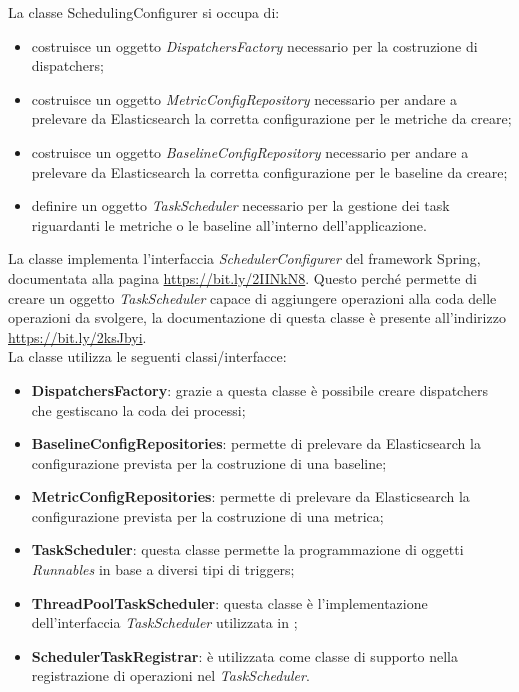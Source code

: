         La classe SchedulingConfigurer si occupa di:
        \begin{itemize}
        	\item costruisce un oggetto \textit{DispatchersFactory} necessario per la costruzione di dispatchers;
        	\item costruisce un oggetto \textit{MetricConfigRepository} necessario per andare a prelevare da 
        		Elasticsearch la corretta configurazione per le metriche da creare;
        	\item costruisce un oggetto \textit{BaselineConfigRepository} necessario per andare a prelevare da 
        		Elasticsearch la corretta configurazione per le baseline da creare;
        	\item definire un oggetto \textit{TaskScheduler} necessario per la gestione dei task riguardanti
        		le metriche o le baseline all'interno dell'applicazione.
        \end{itemize}
        La classe implementa l'interfaccia \textit{SchedulerConfigurer} del framework Spring, documentata alla pagina
        \url{https://bit.ly/2IINkN8}. Questo perché permette di creare un oggetto \textit{TaskScheduler}
        capace di aggiungere operazioni alla coda delle operazioni da svolgere, la documentazione di questa 
        classe è presente all'indirizzo \url{https://bit.ly/2ksJbyi}. \\
        La classe utilizza le seguenti classi/interfacce:
        \begin{itemize}
        	\item \textbf{DispatchersFactory}: grazie a questa classe è possibile creare dispatchers che gestiscano la coda
        		dei processi;
        	\item \textbf{BaselineConfigRepositories}: permette di prelevare da Elasticsearch la configurazione prevista
        		per la costruzione di una baseline;
        	\item \textbf{MetricConfigRepositories}: permette di prelevare da Elasticsearch la configurazione prevista
        		per la costruzione di una metrica;
        	\item \textbf{TaskScheduler}: questa classe permette la programmazione di oggetti \textit{Runnables} in
        		base a diversi tipi di triggers;
        	\item \textbf{ThreadPoolTaskScheduler}: questa classe è l'implementazione dell'interfaccia \textit{TaskScheduler} 
				utilizzata in \ProjectName{};
        	\item \textbf{SchedulerTaskRegistrar}: è utilizzata come classe di supporto nella registrazione di 
        		operazioni nel \textit{TaskScheduler}.
        \end{itemize}
		
